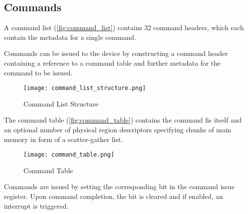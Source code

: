 \subsection{Commands}

A command list (\autoref{fig:command_list}) contains 32 command headers, which
each contain the metadata for a single command.

Commands can be issued to the device by constructing a command header
containing a reference to a command table and further metadata for the command
to be issued.

\begin{figure}[ht]
\centering
\texttt{[image: command\_list\_structure.png]}
\caption{Command List Structure \cite[p.~36]{ahci_1.3}}
\label{fig:command_list}
\end{figure}

The command table (\autoref{fig:command_table}) contains the command \ac{fis}
itself and an optional number of physical region descriptors specifying chunks
of main memory in form of a scatter-gather list.

\begin{figure}[ht]
\centering
\texttt{[image: command\_table.png]}
\caption{Command Table \cite[p.~39]{ahci_1.3}}
\label{fig:command_table}
\end{figure}

Commands are issued by setting the corresponding bit in the command issue
register. Upon command completion, the bit is cleared and if enabled, an
interrupt is triggered.

